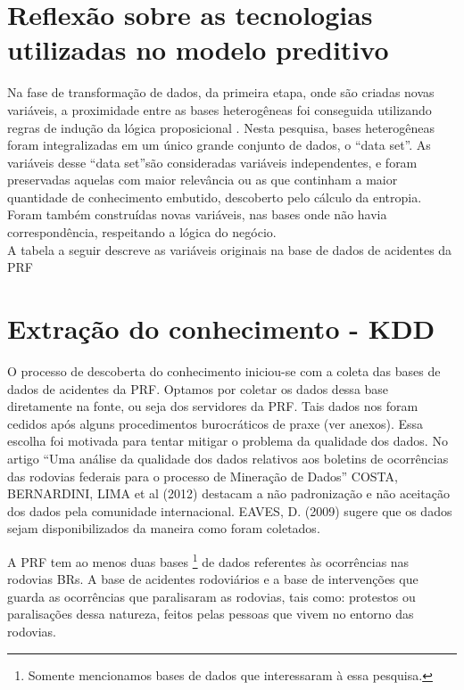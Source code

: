 \section{Reflexão sobre as tecnologias utilizadas no modelo preditivo}\label{result}

Na fase de transformação de dados, da primeira etapa, onde são criadas novas variáveis, a proximidade entre as
bases heterogêneas foi conseguida utilizando regras de indução da lógica proposicional \cite{NorvigRussel2004}.
Nesta pesquisa, bases heterogêneas foram integralizadas em um único grande conjunto de dados, o ``data set''. As variáveis desse ``data set''são consideradas variáveis independentes, e foram preservadas aquelas com maior relevância ou as que continham a maior quantidade de conhecimento embutido, descoberto pelo cálculo da entropia. Foram também construídas novas variáveis, nas bases onde não havia correspondência, respeitando a lógica do negócio.\\
A tabela a seguir descreve as variáveis originais na base de dados de acidentes da PRF 

\pagebreak

\section{Extração do conhecimento - KDD}

O processo de descoberta do conhecimento iniciou-se com a coleta das bases de dados de acidentes da PRF. Optamos por coletar os dados dessa base diretamente na fonte,
ou seja dos servidores da PRF. Tais dados nos foram cedidos após alguns procedimentos burocráticos de praxe (ver anexos). Essa escolha foi motivada para tentar
mitigar o problema da qualidade dos dados. No artigo ``Uma análise da qualidade dos dados relativos aos boletins de ocorrências das rodovias federais para o processo de Mineração de Dados'' COSTA, BERNARDINI, LIMA et al (2012) destacam a não padronização e não aceitação dos dados pela comunidade internacional. EAVES, D. (2009) sugere que os dados sejam disponibilizados da maneira como foram coletados.

A PRF tem ao menos duas bases \footnote{Somente mencionamos bases de dados que interessaram à essa pesquisa.} de dados referentes às ocorrências nas rodovias BRs. A base de acidentes rodoviários e a base de intervenções que guarda as ocorrências que paralisaram as rodovias, tais como: protestos ou paralisações dessa natureza, feitos pelas pessoas que vivem no entorno das rodovias.

